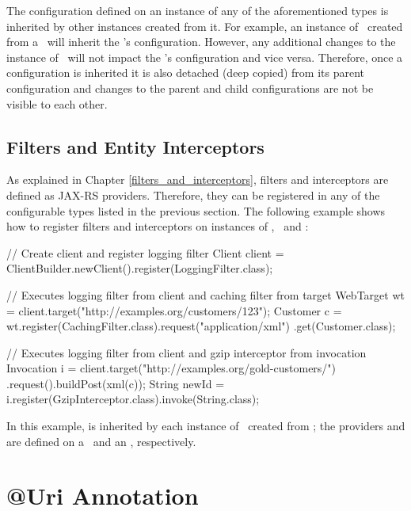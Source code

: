 The configuration defined on an instance of any of the aforementioned types is inherited by other instances created from it. For example, an instance of \WebTarget\ created from a \Client\ will inherit the \Client's configuration. However, any additional changes to the instance of \WebTarget\ will not impact the \Client's configuration and vice versa. Therefore, once a configuration is inherited it is also detached (deep copied) from its parent configuration and changes to the parent and child configurations are not be visible to each other.

\subsection{Filters and Entity Interceptors}
\label{filters_interceptors_client}

As explained in Chapter \ref{filters_and_interceptors}, filters and interceptors are defined as JAX-RS providers. Therefore, they can be registered in any of the configurable types listed in the previous section. The following example shows how to register filters and interceptors on instances of \Client, \WebTarget\ and \Invocation:

\begin{listing}{1}
// Create client and register logging filter
Client client = ClientBuilder.newClient().register(LoggingFilter.class);

// Executes logging filter from client and caching filter from target
WebTarget wt = client.target("http://examples.org/customers/123");
Customer c = wt.register(CachingFilter.class).request("application/xml")
    .get(Customer.class);

// Executes logging filter from client and gzip interceptor from invocation
Invocation i = client.target("http://examples.org/gold-customers/")
    .request().buildPost(xml(c));
String newId = i.register(GzipInterceptor.class).invoke(String.class);
\end{listing}

In this example,  is inherited by each instance of \WebTarget\ created from ; the providers  and  are defined on a \WebTarget\ and an \Invocation, respectively.

\section{@Uri Annotation}
\label{uri_annotation}

